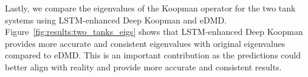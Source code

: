 \documentclass[conference]{IEEEtran}
\begin{document}

Lastly, we compare the eigenvalues of the Koopman operator for the two tank systems using LSTM-enhanced Deep Koopman and eDMD\@. Figure~\ref{fig:results:two_tanks_eigs} shows that LSTM-enhanced Deep Koopman provides more accurate and consistent eigenvalues with original eigenvalues compared to eDMD\@. This is an important contribution as the predictions could better align with reality and provide more accurate and consistent results.
\end{document}
